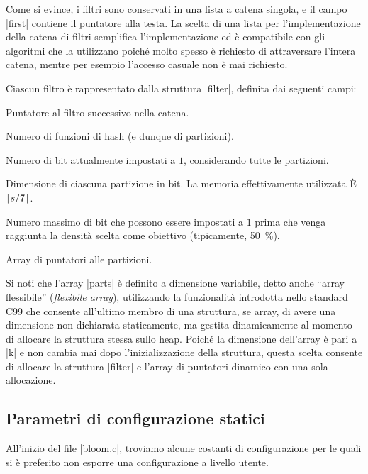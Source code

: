 Come si evince, i filtri sono conservati in una lista a catena singola, e il campo \cverb|first|
contiene il puntatore alla testa. La scelta di una lista per l'implementazione della catena di
filtri semplifica l'implementazione ed è compatibile con gli algoritmi che la utilizzano poiché
molto spesso è richiesto di attraversare l'intera catena, mentre per esempio l'accesso casuale non è
mai richiesto.

Ciascun filtro è rappresentato dalla struttura \cverb|filter|, definita dai seguenti campi:

\begin{description}[labelindent=2\parindent,leftmargin=!,labelwidth=8em,font={\bfseries\ttfamily}]
  \item[filter *next] Puntatore al filtro successivo nella catena.
  \item[uint32 k] Numero di funzioni di hash (e dunque di par\-ti\-zio\-ni).
  \item[uint64 b] Numero di bit attualmente impostati a $1$, con\-si\-de\-ran\-do tutte le
    partizioni.
  \item[uint64 s] Dimensione di ciascuna partizione in bit. La memoria effettivamente utilizzata È
      $\lceil s/7\rceil$.
  \item[uint64 bmax] Numero massimo di bit che possono essere impostati a $1$ prima che venga
      raggiunta la densità scelta come obiettivo (tipicamente, \SI{50}{\percent}).
  \item[{uint8 *parts[]}] Array di puntatori alle partizioni.
\end{description}

Si noti che l'array \cverb|parts| è definito a dimensione variabile, detto anche ``array
flessibile'' (\emph{flexibile array}), utilizzando la funzionalità introdotta nello standard C99 che
consente all'ultimo membro di una struttura, se array, di avere una dimensione non dichiarata
staticamente, ma gestita dinamicamente al momento di allocare la struttura stessa sullo heap. Poiché
la dimensione dell'array è pari a \cverb|k| e non cambia mai dopo l'inizializzazione della
struttura, questa scelta consente di allocare la struttura \cverb|filter| e l'array di puntatori
dinamico con una sola allocazione.

\subsection{Parametri di configurazione statici}
\label{sec:patch:staticparms}

All'inizio del file \cverb|bloom.c|, troviamo alcune costanti di configurazione per le quali si è
preferito non esporre una configurazione a livello utente.

